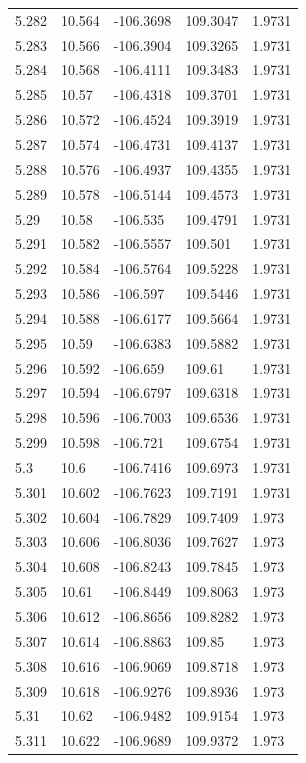 \begin{tabular}{lllll}
5.282 & 10.564 & -106.3698 & 109.3047 & 1.9731 \\
5.283 & 10.566 & -106.3904 & 109.3265 & 1.9731 \\
5.284 & 10.568 & -106.4111 & 109.3483 & 1.9731 \\
5.285 & 10.57 & -106.4318 & 109.3701 & 1.9731 \\
5.286 & 10.572 & -106.4524 & 109.3919 & 1.9731 \\
5.287 & 10.574 & -106.4731 & 109.4137 & 1.9731 \\
5.288 & 10.576 & -106.4937 & 109.4355 & 1.9731 \\
5.289 & 10.578 & -106.5144 & 109.4573 & 1.9731 \\
5.29 & 10.58 & -106.535 & 109.4791 & 1.9731 \\
5.291 & 10.582 & -106.5557 & 109.501 & 1.9731 \\
5.292 & 10.584 & -106.5764 & 109.5228 & 1.9731 \\
5.293 & 10.586 & -106.597 & 109.5446 & 1.9731 \\
5.294 & 10.588 & -106.6177 & 109.5664 & 1.9731 \\
5.295 & 10.59 & -106.6383 & 109.5882 & 1.9731 \\
5.296 & 10.592 & -106.659 & 109.61 & 1.9731 \\
5.297 & 10.594 & -106.6797 & 109.6318 & 1.9731 \\
5.298 & 10.596 & -106.7003 & 109.6536 & 1.9731 \\
5.299 & 10.598 & -106.721 & 109.6754 & 1.9731 \\
5.3 & 10.6 & -106.7416 & 109.6973 & 1.9731 \\
5.301 & 10.602 & -106.7623 & 109.7191 & 1.9731 \\
5.302 & 10.604 & -106.7829 & 109.7409 & 1.973 \\
5.303 & 10.606 & -106.8036 & 109.7627 & 1.973 \\
5.304 & 10.608 & -106.8243 & 109.7845 & 1.973 \\
5.305 & 10.61 & -106.8449 & 109.8063 & 1.973 \\
5.306 & 10.612 & -106.8656 & 109.8282 & 1.973 \\
5.307 & 10.614 & -106.8863 & 109.85 & 1.973 \\
5.308 & 10.616 & -106.9069 & 109.8718 & 1.973 \\
5.309 & 10.618 & -106.9276 & 109.8936 & 1.973 \\
5.31 & 10.62 & -106.9482 & 109.9154 & 1.973 \\
5.311 & 10.622 & -106.9689 & 109.9372 & 1.973 \\

\end{tabular}
